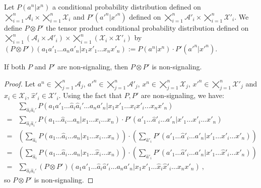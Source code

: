 \begin{definition}
  Let $P(a^n|x^n)$ a conditional probability distribution defined on $\bigtimes_{i=1}^n\mathcal{A}_i \times \bigtimes_{i=1}^n \mathcal{X}_i$ and $P'(a'^n|x'^n)$ defined on $\bigtimes_{i=1}^n\mathcal{A}'_i \times \bigtimes_{i=1}^n \mathcal{X}'_i$. We define $P \otimes P'$ the tensor product conditional probability distribution defined on $\bigtimes_{i=1}^n(\mathcal{A}_i \times \mathcal{A}'_i) \times \bigtimes_{i=1}^n (\mathcal{X}_i \times \mathcal{X}'_i)$ by $\left(P \otimes P'\right)(a_1a'_1\ldots a_na'_n|x_1x'_1\ldots x_nx'_n) := P(a^n|x^n) \cdot P'(a'^n|x'^n)$.
\end{definition}

\begin{lemma}

  \label{lem:NStensor}
  If both $P$ and $P'$ are non-signaling, then $P \otimes P'$ is non-signaling.
\end{lemma}
\begin{proof}
  Let $a^n \in \bigtimes_{j=1}^n\mathcal{A}_j$, $a'^n \in \bigtimes_{j=1}^n\mathcal{A}'_j$, $x^n \in \bigtimes_{j=1}^n \mathcal{X}_j$, $x'^n \in \bigtimes_{j=1}^n \mathcal{X}'_j$ and $\hat{x}_i \in \mathcal{X}_i$, $\hat{x}'_i \in \mathcal{X}'_i$. Using the fact that $P,P'$ are non-signaling, we have:
  \begin{equation}
    \begin{aligned}
      &\sum_{\hat{a}_i\hat{a}_i'}P(a_1a'_1\ldots \hat{a}_i\hat{a}_i' \ldots a_na'_n|x_1x'_1\ldots x_ix'_i \ldots x_nx'_n)\\
      = &\sum_{\hat{a}_i\hat{a}_i'}  P(a_1\ldots \hat{a}_i \ldots a_n|x_1\ldots x_i \ldots x_n) \cdot P'(a'_1\ldots \hat{a}'_i \ldots a'_n|x'_1\ldots x'_i \ldots x'_n)\\
      = &\left(\sum_{\hat{a}_i}  P(a_1\ldots \hat{a}_i \ldots a_n|x_1\ldots x_i \ldots x_n)\right) \cdot \left(\sum_{\hat{a}'_i}  P'(a'_1\ldots \hat{a}'_i \ldots a'_n|x'_1\ldots x'_i \ldots x'_n)\right)\\
      = &\left(\sum_{\hat{a}_i}  P(a_1\ldots \hat{a}_i \ldots a_n|x_1\ldots \hat{x}_i \ldots x_n)\right) \cdot \left(\sum_{\hat{a}'_i}  P'(a'_1\ldots \hat{a}'_i \ldots a'_n|x'_1\ldots \hat{x}'_i \ldots x'_n)\right)\\
      = &\sum_{\hat{a}_i\hat{a}_i'}\left(P \otimes P'\right)(a_1a'_1\ldots \hat{a}_i\hat{a}'_i \ldots a_na'_n|x_1x'_1\ldots \hat{x}_i\hat{x}'_i \ldots x_nx'_n) \ ,
    \end{aligned}
  \end{equation}
  so $P \otimes P'$ is non-signaling.
\end{proof}


